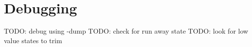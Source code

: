 \chapter{Debugging}

TODO: debug using -dump 
TODO: check for run away state 
TODO: look for low value states to trim

